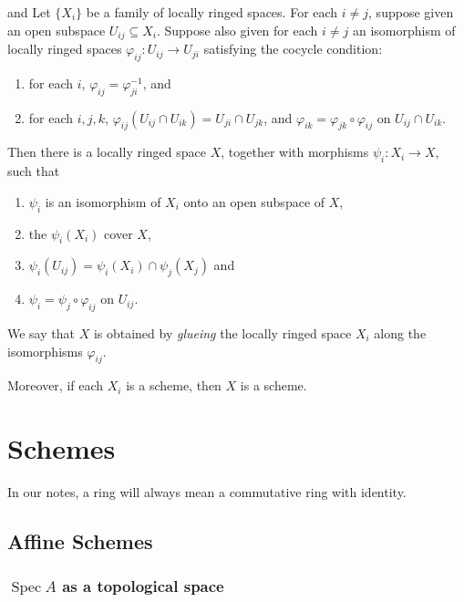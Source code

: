 \documentclass[11pt]{article}
\newcommand{\Spec}{\operatorname{Spec}}
\begin{document}
\begin{proposition}
  \cite[Exercise II.2.12]{hartsAG} and \cite[Lemma 26.14.1]{stacks} 
  Let $ \{X_{i}\} $ be a family of locally ringed spaces. For each $ i \neq j $, 
  suppose given an open subspace $ U_{ij} \subseteq X_{i} $. 
  Suppose also given for each $ i \neq j $ an isomorphism of locally ringed spaces 
  $ \varphi_{ij} : U_{ij} \to U_{ji} $ satisfying the cocycle condition: 
  \begin{enumerate}[label=(\arabic*)]
    \item for each $ i $, $ \varphi_{ij} = \varphi_{ji}^{-1} $, and
    \item for each $ i,j,k $, $ \varphi_{ij}(U_{ij} \cap U_{ik}) = U_{ji} \cap U_{jk} $, 
    and $ \varphi_{ik} = \varphi_{jk} \circ \varphi_{ij} $ on $ U_{ij} \cap U_{ik} $. 
  \end{enumerate}
  Then there is a locally ringed space $ X $, together with morphisms 
  $ \psi_{i} : X_{i} \to X $, such that 
  \begin{enumerate}[label=(\arabic*)]
    \item $ \psi_{i} $ is an isomorphism of $ X_{i} $ onto an open subspace of $ X $, 
    \item the $ \psi_{i}(X_{i}) $ cover $ X $, 
    \item $ \psi_{i}(U_{ij}) = \psi_{i}(X_{i}) \cap \psi_{j}(X_{j}) $ and 
    \item $ \psi_{i} = \psi_{j} \circ \varphi_{ij} $ on $ U_{ij} $. 
  \end{enumerate}
  We say that $ X $ is obtained by \emph{glueing} the locally ringed space $ X_{i} $ 
  along the isomorphisms $ \varphi_{ij} $. 

  Moreover, if each $ X_{i} $ is a scheme, then $ X $ is a scheme. 
\end{proposition}

\section{Schemes}
In our notes, a ring will always mean a commutative ring with identity. 

\subsection{Affine Schemes}

\subsubsection{$ \Spec A $ as a topological space}
\end{document}
